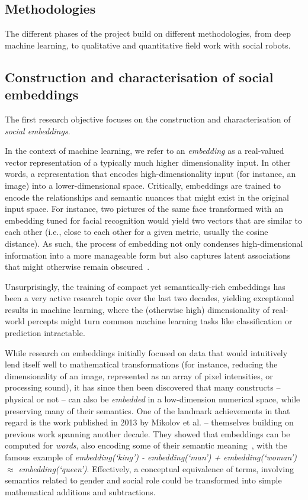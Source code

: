 \subsection{Methodologies}

The different phases of the \project project build on different methodologies,
from deep machine learning, to qualitative and quantitative field work with
social robots.

\subsection{Construction and characterisation of social embeddings}

The first research objective focuses on the construction and characterisation of
\emph{social embeddings}.

In the context of machine learning, we refer to an \emph{embedding} as a
real-valued vector representation of a typically much higher dimensionality
input. In other words, a representation that encodes high-dimensionality input
(for instance, an image) into a lower-dimensional space. Critically, embeddings
are trained to encode the relationships and semantic nuances that might exist in
the original input space. For instance, two pictures of the same face
transformed with an embedding tuned for facial recognition would yield two
vectors that are similar to each other (i.e., close to each other for a given
metric, usually the cosine distance). As such, the process of embedding not only
condenses high-dimensional information into a more manageable form but also
captures latent associations that might otherwise remain
obscured~\cite{bengio2009learning}.

Unsurprisingly, the training of compact yet semantically-rich embeddings has
been a very active research topic over the last two decades, yielding
exceptional results in machine learning, where the (otherwise high)
dimensionality of real-world percepts might turn common machine learning
tasks like classification or prediction intractable.

While research on embeddings initially focused on data that would intuitively
lend itself well to mathematical transformations (for instance, reducing the
dimensionality of an image, represented as an array of pixel intensities, or
processing sound), it has since then been discovered that many constructs --
physical or not -- can also be \emph{embedded} in a low-dimension numerical
space, while preserving many of their semantics. One of the landmark
achievements in that regard is the work published in 2013 by Mikolov et al. --
themselves building on previous work spanning another decade.  They showed that
embeddings can be computed for \emph{words}, also encoding some of their
semantic meaning~\cite{mikolov2013efficient}, with the famous example of
\emph{embedding(`king') - embedding(`man') + embedding(`woman') $\approx$
embedding(`queen')}. Effectively, a conceptual equivalence of terms, involving
semantics related to gender and social role could be transformed into simple
mathematical additions and subtractions.

